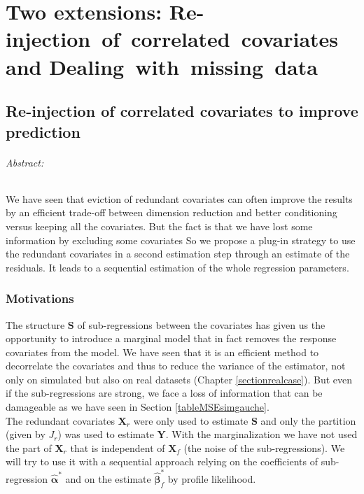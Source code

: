 \documentclass[12pt,a4paper]{report}
\begin{document}
\part{Two extensions: \mbox{Re-injection~of~correlated~covariates}~and \mbox{Dealing with missing data}}	
			
		
\chapter{Re-injection of correlated covariates to improve prediction}\label{chapplugin}
	\paragraph{Abstract:} We have seen that eviction of redundant covariates can often improve the results by an efficient trade-off between dimension reduction and better conditioning versus keeping all the covariates. 
	But the fact is that we have lost some information by excluding some covariates
	So we propose a plug-in strategy to use the redundant covariates in a second estimation step through an estimate of the residuals. It leads to a sequential estimation of the whole regression parameters.%
	\section{Motivations}
		The structure $\boldsymbol{S}$ of sub-regressions between the covariates has given us the opportunity to introduce a marginal model that in fact removes the response covariates from the model. We have seen that it is an efficient method to decorrelate the covariates and thus to reduce the variance of the estimator, not only on simulated but also on real datasets (Chapter \ref{sectionrealcase}). But even if the sub-regressions are strong, we face a loss of information that can be damageable as we have seen in Section \ref{tableMSEsimgauche}. \\
		
		The redundant covariates $\boldsymbol{X}_r$ were only used to estimate $\boldsymbol{S}$ and only the partition (given by $J_r$) was used to estimate $\boldsymbol{Y}$. With the marginalization we have not used the part of $\boldsymbol{X}_r$ that is independent of $\boldsymbol{X}_f$ (the noise of the sub-regressions). We will try to use it with a sequential approach relying on the coefficients of sub-regression $\hat{\boldsymbol{\alpha}}^*$ and on the estimate $\hat{\boldsymbol{\beta}}_f^*$ by profile likelihood.\\
		
\end{document}
